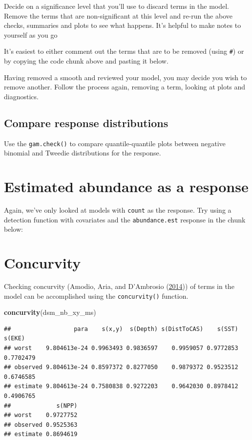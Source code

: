 \documentclass[]{book}
\newenvironment{Shaded}{\begin{snugshade}}{\end{snugshade}}
\newcommand{\KeywordTok}[1]{\textcolor[rgb]{0.13,0.29,0.53}{\textbf{#1}}}
\newcommand{\NormalTok}[1]{#1}
\theoremstyle{definition}
\theoremstyle{definition}
\theoremstyle{remark}
\begin{document}
Decide on a significance level that you'll use to discard terms in the
model. Remove the terms that are non-significant at this level and
re-run the above checks, summaries and plots to see what happens. It's
helpful to make notes to yourself as you go

It's easiest to either comment out the terms that are to be removed
(using \texttt{\#}) or by copying the code chunk above and pasting it
below.

Having removed a smooth and reviewed your model, you may decide you wish
to remove another. Follow the process again, removing a term, looking at
plots and diagnostics.

\subsection{Compare response
distributions}\label{compare-response-distributions}

Use the \texttt{gam.check()} to compare quantile-quantile plots between
negative binomial and Tweedie distributions for the response.

\section{Estimated abundance as a
response}\label{estimated-abundance-as-a-response}

Again, we've only looked at models with \texttt{count} as the response.
Try using a detection function with covariates and the
\texttt{abundance.est} response in the chunk below:

\section{Concurvity}\label{concurvity}

Checking concurvity (Amodio, Aria, and D'Ambrosio
(\protect\hyperlink{ref-Amodio2014}{2014})) of terms in the model can be
accomplished using the \texttt{concurvity()} function.

\begin{Shaded}
\begin{Highlighting}[]
\KeywordTok{concurvity}\NormalTok{(dsm_nb_xy_ms)}
\end{Highlighting}
\end{Shaded}

\begin{verbatim}
##                  para    s(x,y)  s(Depth) s(DistToCAS)    s(SST)    s(EKE)
## worst    9.804613e-24 0.9963493 0.9836597    0.9959057 0.9772853 0.7702479
## observed 9.804613e-24 0.8597372 0.8277050    0.9879372 0.9523512 0.6746585
## estimate 9.804613e-24 0.7580838 0.9272203    0.9642030 0.8978412 0.4906765
##             s(NPP)
## worst    0.9727752
## observed 0.9525363
## estimate 0.8694619
\end{verbatim}
\end{document}
